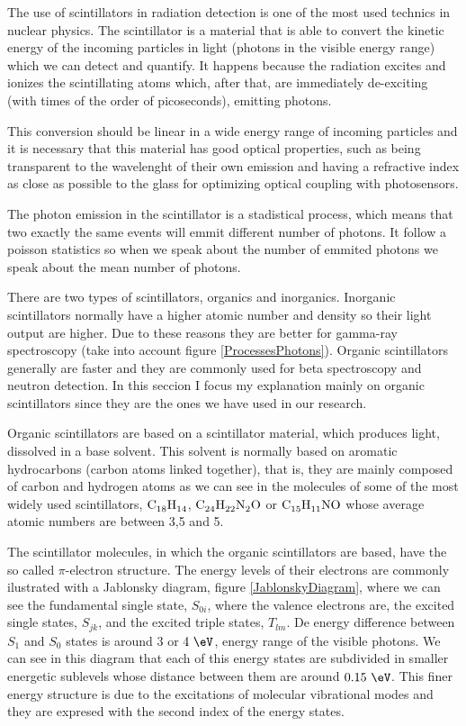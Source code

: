 The use of scintillators in radiation detection is one of the most used technics in nuclear physics. The scintillator is a material that is able to convert the kinetic energy of the incoming particles in light (photons in the visible energy range) which we can detect and quantify. It happens because the radiation excites and ionizes the scintillating atoms which, after that, are immediately de-exciting (with times of the order of picoseconds), emitting photons.

This conversion should be linear in a wide energy range of incoming particles and it is necessary that this material has good optical properties, such as being transparent to the wavelenght of their own emission and having a refractive index as close as possible to the glass for optimizing optical coupling with photosensors.

The photon emission in the scintillator is a stadistical process, which means that two exactly the same events will emmit different number of photons. It follow a poisson statistics so when we speak about the number of emmited photons we speak about the mean number of photons.

There are two types of scintillators, organics and inorganics. Inorganic scintillators normally have a higher atomic number and density so their light output are higher. Due to these reasons they are better for gamma-ray spectroscopy (take into account figure \ref{ProcessesPhotons}). Organic scintillators generally are faster and they are commonly used for beta spectroscopy and neutron detection. In this seccion I focus my explanation mainly on organic scintillators since they are the ones we have used in our research. 

Organic scintillators are based on a scintillator material, which produces light, dissolved in a base solvent. This solvent is normally based on aromatic hydrocarbons (carbon atoms linked together), that is, they are mainly composed of carbon and hydrogen atoms as we can see in the molecules of some of the most widely used scintillators, $\ce{C_{18}H_{14}}$, $\ce{C_{24}H_{22}N_{2}O}$ or $\ce{C_{15}H_{11}NO}$ whose average atomic numbers are between 3,5 and 5.

The scintillator molecules, in which the organic scintillators are based, have the so called $\pi$-electron structure. The energy levels of their electrons are commonly ilustrated with a Jablonsky diagram, figure \ref{JablonskyDiagram}, where we can see the fundamental single state, $S_{0i}$, where the valence electrons are, the excited single states, $S_{jk}$, and the excited triple states, $T_{lm}$. De energy difference between $S_1$ and $S_0$ states is around $3$ or $4~\eV$, energy range of the visible photons. We can see in this diagram that each of this energy states are subdivided in smaller energetic sublevels whose distance between them are around $0.15~\eV$. This finer energy structure is due to the excitations of molecular vibrational modes and they are expresed with the second index of the energy states.

